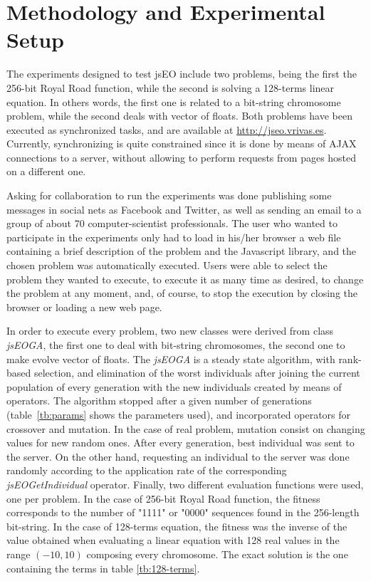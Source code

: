 \documentclass[runningheads,a4paper]{llncs}
\begin{document}
\section{Methodology and Experimental Setup}
\label{sec:method}
The experiments designed to test jsEO include two problems, being the first the 256-bit Royal Road function, while the second is solving a 128-terms linear equation. In others words, the first one is related to a bit-string chromosome problem, while the second deals with vector of floats. Both problems have been executed as synchronized tasks, and are available at \url{http://jseo.vrivas.es}. Currently, synchronizing is quite constrained since it is done by means of AJAX connections to a server, without allowing to perform requests from pages hosted on a different one. 

Asking for collaboration to run the experiments was done publishing some messages in social nets as Facebook and Twitter, as well as sending an email to a group of about 70 computer-scientist professionals. The user who wanted to participate in the experiments only had to load in his/her browser a web file containing a brief description of the problem and the Javascript library, and the chosen problem was automatically executed. Users were able to select the problem they wanted to execute, to execute it as many time as desired, to change the problem at any moment, and, of course, to stop the execution by closing the browser or loading a new web page.

In order to execute every problem, two new classes were derived from class \textit{jsEOGA}, the first one to deal with bit-string chromosomes, the second one to make evolve vector of floats. The \textit{jsEOGA} is a steady state algorithm, with rank-based selection, and elimination of the worst individuals after joining the current population of every generation with the new individuals created by means of operators. The algorithm stopped after a given number of generations (table~\ref{tb:params} shows the parameters used), and incorporated operators for crossover and mutation. In the case of real problem, mutation consist on changing values for new random ones. After every generation, best individual was sent to the server. On the other hand, requesting an individual to the server was done randomly according to the application rate of the corresponding \textit{jsEOGetIndividual} operator. Finally, two different evaluation functions were used, one per problem. In the case of 256-bit Royal Road function, the fitness corresponds to the number of "1111" or "0000" sequences found in the 256-length bit-string. In the case of 128-terms equation, the fitness was the inverse of the value obtained when evaluating a linear equation with 128 real values in the range $(-10,10)$ composing every chromosome. The exact solution is the one containing the terms in table \ref{tb:128-terms}.
\end{document}
